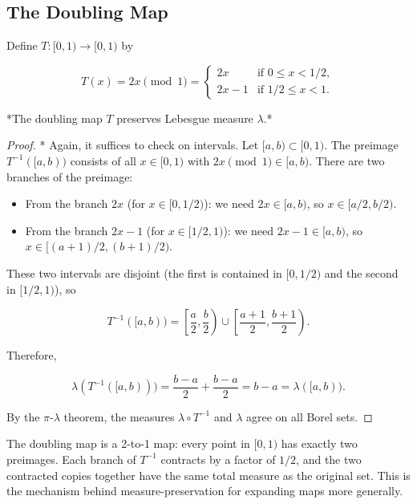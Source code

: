 \subsection{The Doubling Map}\label{sec:8.2.2}

Define $T: [0,1) \to [0,1)$ by

\[
T(x) = 2x \pmod{1} = \begin{cases} 2x & \text{if } 0 \le x < 1/2, \\ 2x - 1 & \text{if } 1/2 \le x < 1. \end{cases}
\]

\begin{proposition}\label{prop:8.6.}
*The doubling map $T$ preserves Lebesgue measure $\lambda$.*
\end{proposition}


\begin{proof}
* Again, it suffices to check on intervals. Let $[a,b) \subset [0,1)$. The preimage $T^{-1}([a,b))$ consists of all $x \in [0,1)$ with $2x \pmod 1 \in [a,b)$. There are two branches of the preimage:

\begin{itemize}[nosep]
  \item From the branch $2x$ (for $x \in [0, 1/2)$): we need $2x \in [a, b)$, so $x \in [a/2, b/2)$.
  \item From the branch $2x - 1$ (for $x \in [1/2, 1)$): we need $2x - 1 \in [a, b)$, so $x \in [(a+1)/2, (b+1)/2)$.
\end{itemize}

These two intervals are disjoint (the first is contained in $[0, 1/2)$ and the second in $[1/2, 1)$), so

\[
T^{-1}([a,b)) = \left[\frac{a}{2}, \frac{b}{2}\right) \cup \left[\frac{a+1}{2}, \frac{b+1}{2}\right).
\]

Therefore,

\[
\lambda(T^{-1}([a,b))) = \frac{b-a}{2} + \frac{b-a}{2} = b - a = \lambda([a,b)).
\]

By the $\pi$-$\lambda$ theorem, the measures $\lambda \circ T^{-1}$ and $\lambda$ agree on all Borel sets.
\end{proof}


\begin{remark}
The doubling map is a 2-to-1 map: every point in $[0,1)$ has exactly two preimages. Each branch of $T^{-1}$ contracts by a factor of $1/2$, and the two contracted copies together have the same total measure as the original set. This is the mechanism behind measure-preservation for expanding maps more generally.
\end{remark}


